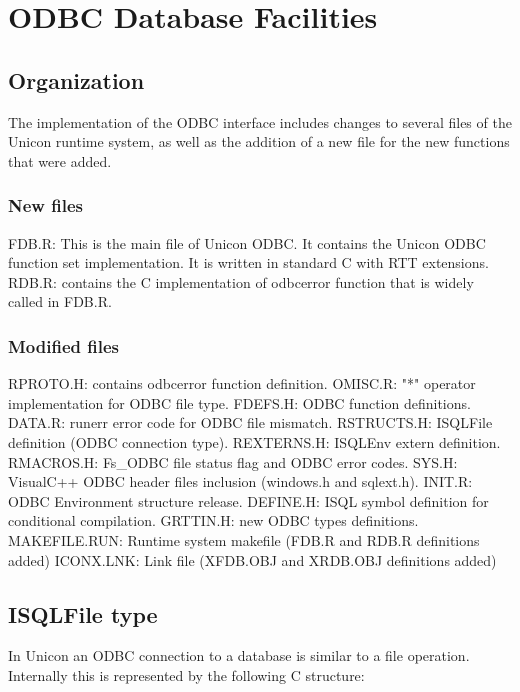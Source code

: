 \chapter{ODBC Database Facilities}

\section{Organization}

The implementation of the ODBC interface includes changes to several
files of the Unicon runtime system, as well as the addition of a new
file for the new functions that were added.

\subsection{New files}

    FDB.R: This is the main file of Unicon ODBC. It contains the Unicon ODBC function set implementation. It is written in standard C with RTT extensions.
    RDB.R: contains the C implementation of odbcerror function that is widely called in FDB.R.

\subsection{Modified files}

    RPROTO.H: contains odbcerror function definition.
    OMISC.R: "*" operator implementation for ODBC file type.
    FDEFS.H: ODBC function definitions.
    DATA.R: runerr error code for ODBC file mismatch.
    RSTRUCTS.H: ISQLFile definition (ODBC connection type).
    REXTERNS.H: ISQLEnv extern definition.
    RMACROS.H: Fs\_ODBC file status flag and ODBC error codes.
    SYS.H: VisualC++ ODBC header files inclusion (windows.h and sqlext.h).
    INIT.R: ODBC Environment structure release.
    DEFINE.H: ISQL symbol definition for conditional compilation.
    GRTTIN.H: new ODBC types definitions.
    MAKEFILE.RUN: Runtime system makefile (FDB.R and RDB.R definitions added)
    ICONX.LNK: Link file (XFDB.OBJ and XRDB.OBJ definitions added)

\section{ISQLFile type}

In Unicon an ODBC connection to a database is similar to a file
operation. Internally this is represented by the following C
structure:

